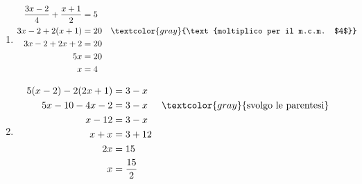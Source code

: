 \begin{question}[ID=2.4, subtitle={Equazioni di primo grado}, difficulty=media, tags={equazioni lineari}]
\begin{explanation}
\begin{enumerate}
    \item \[\begin{aligned}
    \dfrac{3x-2}{4}+\dfrac{x+1}{2} &= 5\\
    3x-2+2(x+1) &= 20 && \textcolor{gray}{\text{moltiplico per il m.c.m. $4$}}\\
    3x-2+2x+2 &= 20\\
    5x &= 20\\
    x &= 4
    \end{aligned}\]
    \item \[\begin{aligned}
    5(x-2)-2(2x+1) &= 3-x\\
    5x-10-4x-2 &= 3-x && \textcolor{gray}{\text{svolgo le parentesi}}\\
    x-12 &= 3-x\\
    x+x &= 3+12\\
    2x &= 15\\
    x &= \dfrac{15}{2}
    \end{aligned}\]
\end{enumerate}
\end{explanation}
\end{question}


